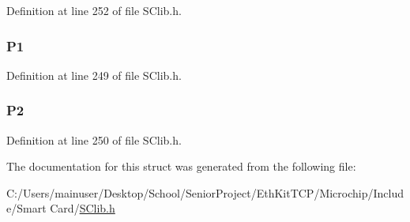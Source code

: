 Definition at line 252 of file S\+Clib.\+h.

\hypertarget{struct_s_c___a_p_d_u___c_o_m_m_a_n_d_aa143074e765d90231d2eef460ef7d31c}{}
\subsubsection[{P1}]{ P1}\label{struct_s_c___a_p_d_u___c_o_m_m_a_n_d_aa143074e765d90231d2eef460ef7d31c}


Definition at line 249 of file S\+Clib.\+h.

\hypertarget{struct_s_c___a_p_d_u___c_o_m_m_a_n_d_ae3b65bb5575b73a82a168b17e12f39e3}{}
\subsubsection[{P2}]{ P2}\label{struct_s_c___a_p_d_u___c_o_m_m_a_n_d_ae3b65bb5575b73a82a168b17e12f39e3}


Definition at line 250 of file S\+Clib.\+h.



The documentation for this struct was generated from the following file\+:\begin{DoxyCompactItemize}
\item 
C\+:/\+Users/mainuser/\+Desktop/\+School/\+Senior\+Project/\+Eth\+Kit\+T\+C\+P/\+Microchip/\+Include/\+Smart Card/\hyperlink{_s_clib_8h}{S\+Clib.\+h}\end{DoxyCompactItemize}
